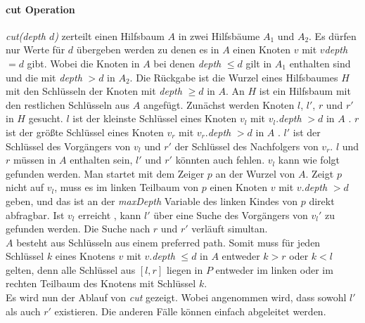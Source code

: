 \documentclass[a4paper,12pt]{article}
\begin{document}
\paragraph{cut Operation} \label{cut}

\noindent \textit{cut(depth $d$)} zerteilt einen Hilfsbaum $A$ in zwei Hilfsbäume $A_1$ und $A_2$. Es dürfen nur Werte für $d$ übergeben werden zu denen es in $A$ einen Knoten $v$ mit $v$\textit{depth} $ = d $ gibt. Wobei die Knoten in $A$ bei denen \textit{depth} $\leq d$ gilt in $A_1$ enthalten sind und die mit \textit{depth} $ > d$ in $A_2$. Die Rückgabe ist die Wurzel eines Hilfsbaumes $H$ mit den Schlüsseln der Knoten mit \textit{depth} $\geq d$ in $A$. An $H$ ist ein Hilfsbaum mit den restlichen Schlüsseln aus $A$ angefügt. Zunächst werden Knoten $l$,  $l'$, $r$ und $r'$ in $H$ gesucht. $l$ ist der kleinste Schlüssel eines Knoten $v_l$ mit $v_l$.\textit{depth} $> d$  in $A$ . $r$ ist der größte Schlüssel eines Knoten $v_r$ mit $v_r$.\textit{depth} $> d$  in $A$  . $l'$ ist der Schlüssel des Vorgängers von $v_l$ und $r'$ der Schlüssel des Nachfolgers von $v_r$. $l$ und $r$ müssen in $A$ enthalten sein, $l'$ und $r'$ könnten auch fehlen. $v_l$ kann wie folgt gefunden werden. Man startet mit dem Zeiger $p$ an der Wurzel von $A$. Zeigt $p$ nicht auf $v_l$, muss es im linken Teilbaum von $p$ einen Knoten $v$ mit $v$.\textit{depth} $> d$ geben, und das ist an der \textit{maxDepth} Variable des linken Kindes von $p$ direkt abfragbar. Ist $v_l$ erreicht , kann $l'$ über eine Suche des Vorgängers von $v_l'$ zu gefunden werden. Die Suche nach $r$ und $r'$ verläuft simultan. \\
$A$ besteht aus Schlüsseln aus einem preferred path. Somit muss für jeden Schlüssel $k$ eines Knotens $v$ mit $v$.\textit{depth} $\leq d$ in $A$ entweder $k > r$ oder $k < l$ gelten, denn alle Schlüssel aus $\left[l,r\right]$ liegen in $P$ entweder im linken oder im rechten Teilbaum des Knotens mit Schlüssel $k$. \\
Es wird nun der Ablauf von \textit{cut} gezeigt. Wobei angenommen wird, dass sowohl $l'$ als auch $r'$ existieren. Die anderen Fälle können einfach abgeleitet werden.
\end{document}

